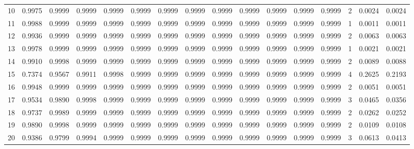 \begin{tabular}{lrrrrrrrrrrrrrrr}
10  &      0.9975 &  0.9999 &  0.9999 &  0.9999 &  0.9999 &  0.9999 &  0.9999 &  0.9999 &  0.9999 &  0.9999 &   0.9999 &     0.9999 &      2 &                    0.0024 &                     0.0024 \\
11  &      0.9988 &  0.9999 &  0.9999 &  0.9999 &  0.9999 &  0.9999 &  0.9999 &  0.9999 &  0.9999 &  0.9999 &   0.9999 &     0.9999 &      1 &                    0.0011 &                     0.0011 \\
12  &      0.9936 &  0.9999 &  0.9999 &  0.9999 &  0.9999 &  0.9999 &  0.9999 &  0.9999 &  0.9999 &  0.9999 &   0.9999 &     0.9999 &      2 &                    0.0063 &                     0.0063 \\
13  &      0.9978 &  0.9999 &  0.9999 &  0.9999 &  0.9999 &  0.9999 &  0.9999 &  0.9999 &  0.9999 &  0.9999 &   0.9999 &     0.9999 &      1 &                    0.0021 &                     0.0021 \\
14  &      0.9910 &  0.9998 &  0.9999 &  0.9999 &  0.9999 &  0.9999 &  0.9999 &  0.9999 &  0.9999 &  0.9999 &   0.9999 &     0.9999 &      2 &                    0.0089 &                     0.0088 \\
15  &      0.7374 &  0.9567 &  0.9911 &  0.9998 &  0.9999 &  0.9999 &  0.9999 &  0.9999 &  0.9999 &  0.9999 &   0.9999 &     0.9999 &      4 &                    0.2625 &                     0.2193 \\
16  &      0.9948 &  0.9999 &  0.9999 &  0.9999 &  0.9999 &  0.9999 &  0.9999 &  0.9999 &  0.9999 &  0.9999 &   0.9999 &     0.9999 &      2 &                    0.0051 &                     0.0051 \\
17  &      0.9534 &  0.9890 &  0.9998 &  0.9999 &  0.9999 &  0.9999 &  0.9999 &  0.9999 &  0.9999 &  0.9999 &   0.9999 &     0.9999 &      3 &                    0.0465 &                     0.0356 \\
18  &      0.9737 &  0.9989 &  0.9999 &  0.9999 &  0.9999 &  0.9999 &  0.9999 &  0.9999 &  0.9999 &  0.9999 &   0.9999 &     0.9999 &      2 &                    0.0262 &                     0.0252 \\
19  &      0.9890 &  0.9998 &  0.9999 &  0.9999 &  0.9999 &  0.9999 &  0.9999 &  0.9999 &  0.9999 &  0.9999 &   0.9999 &     0.9999 &      2 &                    0.0109 &                     0.0108 \\
20  &      0.9386 &  0.9799 &  0.9994 &  0.9999 &  0.9999 &  0.9999 &  0.9999 &  0.9999 &  0.9999 &  0.9999 &   0.9999 &     0.9999 &      3 &                    0.0613 &                     0.0413 \\

\end{tabular}
